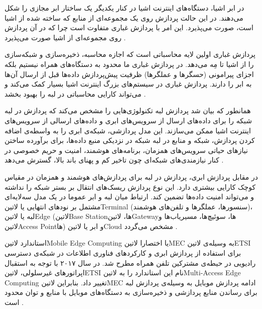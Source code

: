 
در ابر اشیا، دستگاه‌های اینترنت اشیا در کنار یکدیگر یک ساختار ابر مجازی را شکل می‌دهند. در این حالت پردازش روی یک مجموعه‌ای از منابع که ساخته شده از اشیا است، صورت می‌پذیرد.
این امر با پردازش غباری متفاوت است چرا که در آن پردازش روی مجموعه‌ای از اشیا صورت می‌پذیرد
.


پردازش غباری اولین لایه محاسباتی است که اجازه محاسبه، ذخیره‌سازی و شبکه‌سازی را از اشیا تا مِه می‌دهد. در پردازش غباری ما محدود به دستگاه‌های همراه نیستیم بلکه اجزای پیرامونی (حسگرها و عملگرها)
ظرفیت پیش‌پردازش داده‌ها قبل از ارسال آن‌ها به ابر را دارند. پردازش غباری در سیستم‌های بزرگ اینترنت اشیا بسیار کمک می‌کند و می‌تواند کارایی محاسباتی در لبه را بهبود بخشد
.


همانطور که بیان شد پردازش لبه تکنولوژی‌هایی را مشخص می‌کند که پردازش در لبه شبکه را برای داده‌های ارسال از سرویس‌های ابری و داده‌های ارسالی از سرویس‌های اینترنت اشیا ممکن می‌سازند.
این مدل پردازشی، شبکه‌ی ابری را به واسطه‌ی اضافه کردن پردازش، شبکه و منابع در لبه شبکه در نزدیکی منبع داده‌ها، برای برآورده ساختن نیازهای حیاتی سرویس‌های همزمان، برنامه‌های هوشمند،
امنیت و حریم خصوصی در کنار نیازمندی‌های شبکه‌ای چون تاخیر کم و پهنای باند بالا، گسترش می‌دهد
.

در مقابل پردازش ابری، پردازش در لبه برای پردازش‌های هوشمند و همزمان در مقیاس کوچک کارایی بیشتری دارد. این نوع پردازش ریسک‌های انتقال بر بستر شبکه را نداشته و می‌تواند امنیت داده‌ها تضمین کند.
ارتباط میان لبه و ابر عموما در یک مدل سه‌لایه‌ای مشتمل بر نودهای انتهایی یا ‌لاتین{Terminal} (سنسورها، عملگرها و تلفن‌های هوشمند)،
لبه یا ‌لاتین{Edge} (‌لاتین{Base Station}ها، ‌لاتین{Gateway}ها، سوئیچ‌ها، مسیریاب‌ها و ‌لاتین{Access Point}ها)
و ابر یا ‌لاتین{Cloud} مشخص می‌گردد
.


استاندارد ‌لاتین{Mobile Edge Computing} یا اختصارا ‌لاتین{MEC} به وسیله‌ی ‌لاتین{ETSI} برای استفاده از پردازش ابری و کارکردهای فناوری اطلاعات در شبکه‌ی دسترسی رادیویی
در حیطه‌ی مشترکین تلفن همراه مطرح شد. در سال ۲۰۱۷ با توجه به استقبال اپراتورهای غیرسلولی، ‌لاتین{ETSI} نام این استاندارد را به ‌لاتین{Multi-Access Edge Computing}
تغییر داد. بنابراین ‌لاتین{MEC} ادامه پردازش موبایل به وسیله‌ی پردازش لبه برای رساندن منابع پردازشی و ذخیره‌سازی به دستگاه‌های موبایل با منابع و توان محدود است
.

